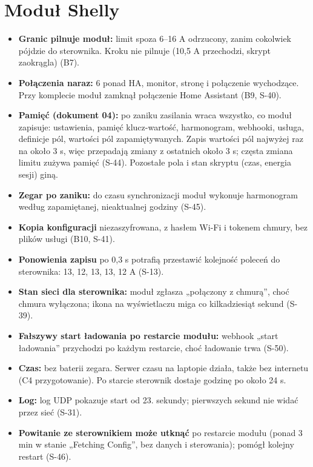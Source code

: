 \documentclass[11pt,a4paper]{article}
\begin{document}
\section*{Moduł Shelly}

\begin{itemize}
\item \textbf{Granic pilnuje moduł:} limit spoza 6–16 A odrzucony, zanim cokolwiek pójdzie do sterownika. Kroku nie pilnuje (10,5 A przechodzi, skrypt zaokrągla) (B7).
\item \textbf{Połączenia naraz:} 6 ponad HA, monitor, stronę i połączenie wychodzące. Przy komplecie moduł zamknął połączenie Home Assistant (B9, S-40).
\item \textbf{Pamięć (dokument 04):} po zaniku zasilania wraca wszystko, co moduł zapisuje: ustawienia, pamięć klucz-wartość, harmonogram, webhooki, usługa, definicje pól, wartości pól zapamiętywanych. Zapis wartości pól najwyżej raz na około 3 s, więc przepadają zmiany z ostatnich około 3 s; częsta zmiana limitu zużywa pamięć (S-44). Pozostałe pola i stan skryptu (czas, energia sesji) giną.
\item \textbf{Zegar po zaniku:} do czasu synchronizacji moduł wykonuje harmonogram według zapamiętanej, nieaktualnej godziny (S-45).
\item \textbf{Kopia konfiguracji} niezaszyfrowana, z hasłem Wi-Fi i tokenem chmury, bez plików usługi (B10, S-41).
\item \textbf{Ponowienia zapisu} po 0,3 s potrafią przestawić kolejność poleceń do sterownika: 13, 12, 13, 13, 12 A (S-13).
\item \textbf{Stan sieci dla sterownika:} moduł zgłasza „połączony z chmurą”, choć chmura wyłączona; ikona na wyświetlaczu miga co kilkadziesiąt sekund (S-39).
\item \textbf{Fałszywy start ładowania po restarcie modułu:} webhook „start ładowania” przychodzi po każdym restarcie, choć ładowanie trwa (S-50).
\item \textbf{Czas:} bez baterii zegara. Serwer czasu na laptopie działa, także bez internetu (C4 przygotowanie). Po starcie sterownik dostaje godzinę po około 24 s.
\item \textbf{Log:} log UDP pokazuje start od 23. sekundy; pierwszych sekund nie widać przez sieć (S-31).
\item \textbf{Powitanie ze sterownikiem może utknąć} po restarcie modułu (ponad 3 min w stanie „Fetching Config”, bez danych i sterowania); pomógł kolejny restart (S-46).
\end{itemize}
\end{document}
